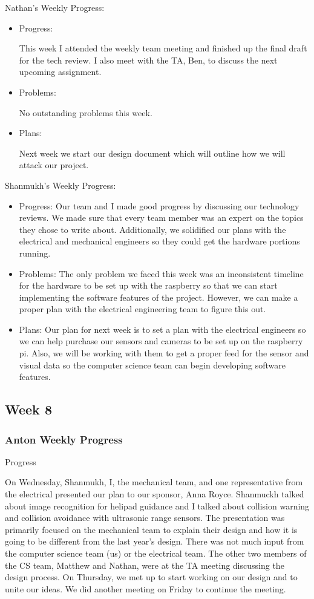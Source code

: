 \documentclass[onecolumn, oneside, letterpaper, draftclsnofoot, 10pt, compsoc]{IEEEtran}
\begin{document}
Nathan's Weekly Progress:
\begin{itemize}
    \item Progress:

This week I attended the weekly team meeting and finished up the final draft for the tech review. I also meet with the TA, Ben, to discuss the next upcoming assignment.
    \item Problems:

No outstanding problems this week.
    \item Plans:

Next week we start our design document which will outline how we will attack our project.
    \end{itemize}
Shanmukh's Weekly Progress:
\begin{itemize}
    \item Progress: Our team and I made good progress by discussing our technology reviews. We made sure that every team member was an expert on the topics they chose to write about. Additionally, we solidified our plans with the electrical and mechanical engineers so they could get the hardware portions running.
    \item Problems: The only problem we faced this week was an inconsistent timeline for the hardware to be set up with the raspberry so that we can start implementing the software features of the project. However, we can make a proper plan with the electrical engineering team to figure this out.
    \item Plans: Our plan for next week is to set a plan with the electrical engineers so we can help purchase our sensors and cameras to be set up on the raspberry pi. Also, we will be working with them to get a proper feed for the sensor and visual data so the computer science team can begin developing software features.
\end{itemize}


\subsection{Week 8}

\subsubsection{Anton Weekly Progress}
Progress

On Wednesday, Shanmukh, I, the mechanical team, and one representative from the electrical presented our plan to our sponsor, Anna Royce. Shanmuckh talked about image recognition for helipad guidance and I talked about collision warning and collision avoidance with ultrasonic range sensors. The presentation was primarily focused on the mechanical team to explain their design and how it is going to be different from the last year's design. There was not much input from the computer science team (us) or the electrical team. The other two members of the CS team, Matthew and Nathan, were at the TA meeting discussing the design process. On Thursday, we met up to start working on our design and to unite our ideas. We did another meeting on Friday to continue the meeting.
\end{document}
